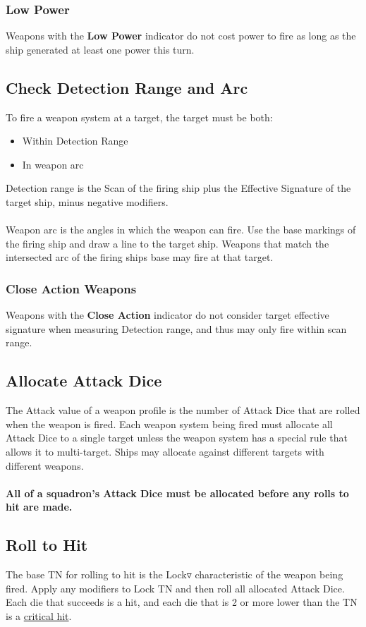 \subsubsection{Low Power}
Weapons with the \textbf{Low Power} indicator do not cost power to fire as long as the ship generated at least one power this turn.

\subsection{Check Detection Range and Arc}
To fire a weapon system at a target, the target must be both:
\begin{itemize}
	\item Within Detection Range
	\item In weapon arc
\end{itemize}
Detection range is the Scan of the firing ship plus the Effective Signature of the target ship, minus negative modifiers.
\\\\
Weapon arc is the angles in which the weapon can fire. Use the base markings of the firing ship and draw a line to the target ship. Weapons that match the intersected arc of the firing ships base may fire at that target.

\subsubsection{Close Action Weapons}
Weapons with the \textbf{Close Action} indicator do not consider target effective signature when measuring Detection range, and thus may only fire within scan range.

\subsection{Allocate Attack Dice}
The Attack value of a weapon profile is the number of Attack Dice that are rolled when the weapon is fired. Each weapon system being fired must allocate all Attack Dice to a single target unless the weapon system has a special rule that allows it to multi-target. Ships may allocate against different targets with different weapons.\\\\
\textbf{All of a squadron's Attack Dice must be allocated before any rolls to hit are made.}

\subsection{Roll to Hit}
The base TN for rolling to hit is the Lock$\triangledown$ characteristic of the weapon being fired. Apply any modifiers to Lock TN and then roll all allocated Attack Dice. Each die that succeeds is a hit, and each die that is 2 or more lower than the TN is a \underline{critical hit}.

